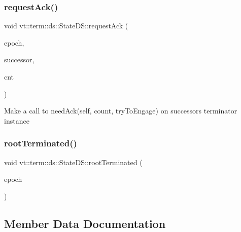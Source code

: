 \mbox{\label{structvt_1_1term_1_1ds_1_1_state_d_s_acdf0151492a1e35c6565c65b138e8ac9}} 
\subsubsection{\texorpdfstring{request\+Ack()}{requestAck()}}
{\footnotesize\ttfamily void vt\+::term\+::ds\+::\+State\+D\+S\+::request\+Ack (\begin{DoxyParamCaption}\item[{\hyperlink{namespacevt_a985a5adf291c34a3ca263b3378388236}{Epoch\+Type}}]{epoch,  }\item[{\hyperlink{structvt_1_1term_1_1ds_1_1_state_d_s_aba302de614dd639f5d93f4f5b6dd6108}{Endpoint}}]{successor,  }\item[{int64\+\_\+t}]{cnt }\end{DoxyParamCaption})\hspace{0.3cm}{\ttfamily [static]}}

Make a call to need\+Ack(self, count, try\+To\+Engage) on successor\textquotesingle{}s terminator instance \mbox{\label{structvt_1_1term_1_1ds_1_1_state_d_s_a26ae9b485dbb46e46b48e73a321cfd8b}} 
\subsubsection{\texorpdfstring{root\+Terminated()}{rootTerminated()}}
{\footnotesize\ttfamily void vt\+::term\+::ds\+::\+State\+D\+S\+::root\+Terminated (\begin{DoxyParamCaption}\item[{\hyperlink{namespacevt_a985a5adf291c34a3ca263b3378388236}{Epoch\+Type}}]{epoch }\end{DoxyParamCaption})\hspace{0.3cm}{\ttfamily [static]}}



\subsection{Member Data Documentation}
\mbox{\label{structvt_1_1term_1_1ds_1_1_state_d_s_a97a12b9645ebe99171d7680baab34b5d}} 
